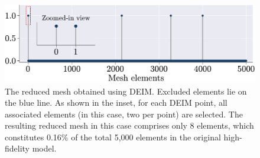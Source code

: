 \documentclass[11pt]{article}
\begin{document}
        \begin{figure}[t]
                \centering
                \includegraphics[width=0.8\linewidth]{reduced_mesh_DEIM_new.pdf}
                \caption{The reduced mesh obtained using DEIM. Excluded  elements lie on the blue line. As shown in the inset, for each DEIM point, all associated elements (in this case, two per point) are selected. The resulting reduced mesh in this case comprises only 8 elements, which constitutes 0.16\% of the total 5,000 elements in the original high-fidelity model.}
                \label{fig:reduced_mesh_deim}
        \end{figure}
\end{document}
